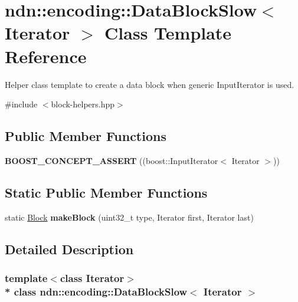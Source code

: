 \hypertarget{classndn_1_1encoding_1_1DataBlockSlow}{}\section{ndn\+:\+:encoding\+:\+:Data\+Block\+Slow$<$ Iterator $>$ Class Template Reference}
\label{classndn_1_1encoding_1_1DataBlockSlow}


Helper class template to create a data block when generic Input\+Iterator is used.  




{\ttfamily \#include $<$block-\/helpers.\+hpp$>$}

\subsection*{Public Member Functions}
\begin{DoxyCompactItemize}
\item 
{\bfseries B\+O\+O\+S\+T\+\_\+\+C\+O\+N\+C\+E\+P\+T\+\_\+\+A\+S\+S\+E\+RT} ((boost\+::\+Input\+Iterator$<$ Iterator $>$))\hypertarget{classndn_1_1encoding_1_1DataBlockSlow_a3a4821de59516aa5d276905233aa415e}{}\label{classndn_1_1encoding_1_1DataBlockSlow_a3a4821de59516aa5d276905233aa415e}

\end{DoxyCompactItemize}
\subsection*{Static Public Member Functions}
\begin{DoxyCompactItemize}
\item 
static \hyperlink{classndn_1_1Block}{Block} {\bfseries make\+Block} (uint32\+\_\+t type, Iterator first, Iterator last)\hypertarget{classndn_1_1encoding_1_1DataBlockSlow_a1101fe743ff152ed2dcbfe169fbb0a12}{}\label{classndn_1_1encoding_1_1DataBlockSlow_a1101fe743ff152ed2dcbfe169fbb0a12}

\end{DoxyCompactItemize}


\subsection{Detailed Description}
\subsubsection*{template$<$class Iterator$>$\\*
class ndn\+::encoding\+::\+Data\+Block\+Slow$<$ Iterator $>$}

